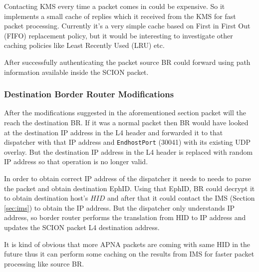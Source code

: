 Contacting KMS every time a packet comes in could be expensive. So it implements a small cache of replies which it received from the KMS for fast packet processing. Currently it's a very simple cache based on First in First Out (FIFO) replacement policy, but it would be interesting to investigate other caching policies like Least Recently Used (LRU) etc.

After successfully authenticating the packet source BR could forward using path information available inside the SCION packet.

\subsubsection{Destination Border Router Modifications} \label{overlay:br_dst}
After the modifications suggested in the aforementioned section packet will the reach the destination BR. If it was a normal packet then BR would have looked at the destination IP address in the L4 header and forwarded it to that dispatcher with that IP address and  \texttt{EndhostPort} (30041) with its existing UDP overlay. But the destination IP address in the L4 header is replaced with random IP address so that operation is no longer valid.

In order to obtain correct IP address of the dispatcher it needs to needs to parse the packet and obtain destination EphID. Using that EphID, BR could decrypt it to obtain destination host's $HID$ and after that it could contact the IMS (Section \ref{sec:ims}) to obtain the IP address. But the dispatcher only understands IP address, so border router performs the translation from HID to IP address and updates the SCION packet L4 destination address.

It is kind of obvious that more APNA packets are coming with same HID in the future thus it can perform some caching on the results from IMS for faster packet processing like source BR.

